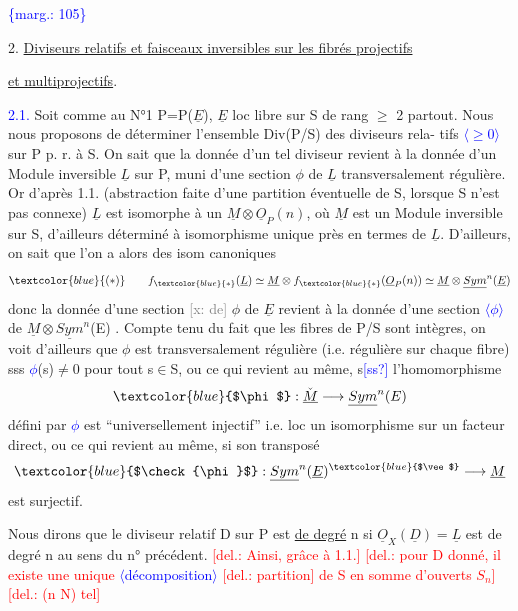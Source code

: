 \documentclass[11pt]{article}
\newcommand{\scanpage}[1]{\par\bigskip\noindent{\small\sffamily[scan #1]}\par}
\newcommand{\mspage}[1]{{\small\sffamily[p.\,#1]}}
\newcommand{\hand}[1]{\textcolor{blue}{#1}}
\newcommand{\inserted}[2][]{\textcolor{blue}{$\langle$#2$\rangle$}}
\newcommand{\margin}[1]{\textcolor{blue}{\{\textsf{marg.:} #1\}}}
\newcommand{\deleted}[1]{\textcolor{red}{[\textsf{del.:} #1]}}
\newcommand{\xout}[1]{\textcolor{gray}{[\textsf{x:} #1]}}
\newcommand{\uline}[1]{\underline{#1}}
\newcommand{\unsure}[1]{[#1?]}
\begin{document}
\margin{105}

\clearpage
\scanpage{25/106}
\mspage{9}

2. \uline{Diviseurs relatifs et faisceaux inversibles sur les fibrés projectifs}

\uline{et multiprojectifs}.

\hand{2.1.} Soit comme au N°1 P=P($\underline{E}$), $\underline{E}$ loc libre sur S de rang $\geqslant$ 2 partout.
Nous nous proposons de déterminer l'ensemble Div(P/S) des diviseurs rela-%
tifs \inserted{$\geqslant 0$} sur P p. r. à S. On sait que la donnée d'un tel diviseur revient à la
donnée d'un Module inversible $\underline{L}$ sur P, muni d'une section $\phi$ de $\underline{L}$
transversalement régulière. Or d'après 1.1. (abstraction faite d'une
partition éventuelle de S, lorsque S n'est pas connexe) $\underline{L}$ est isomorphe
à un $\underline{M}\otimes\underline{O}_P(n)$, où $\underline{M}$ est un Module inversible sur S, d'ailleurs déterminé
à isomorphisme unique près en termes de $\underline{L}$. D'ailleurs, on sait que
l'on a alors des isom canoniques
\[ \hand{(*)} \qquad f_{\hand{*}}(\underline{L}) \simeq \underline{M}\otimes f_{\hand{*}}(\underline{O}_P(n)) \simeq \underline{M}\otimes\underline{Sym}^n(\underline{E}) \]
donc la donnée d'une section \xout{de} $\phi$ de $\underline{E}$ revient à la donnée d'une section
\inserted{$\phi$} de $\underline{M}\otimes\underline{Sym}^n$(E) . Compte tenu du fait que les fibres de P/S sont intègres,
on voit d'ailleurs que $\phi$ est transversalement régulière (i.e. régulière
sur chaque fibre) sss \hand{$\phi$}(s)$\neq$0 pour tout s$\in$S, ou ce qui revient au même,
s\hand{\unsure{ss}} l'homomorphisme
\[ \hand{$\phi$} : \check{\underline{M}} \longrightarrow \underline{Sym}^n(E) \]
défini par \hand{$\phi$} est ``universellement injectif'' i.e. loc un isomorphisme sur
un facteur direct, ou ce qui revient au même, si son transposé
\[ \hand{$\check{\phi}$} : \underline{Sym}^n(\underline{E})^{\hand{$\vee$}} \longrightarrow \underline{M} \]
est surjectif.

Nous dirons que le diviseur relatif D sur P est \uline{de degré} n
si $\underline{O}_X(\underline{D})= \underline{L}$ est de degré n au sens du n° précédent. \deleted{Ainsi, grâce à 1.1.}
\deleted{pour D donné, il existe une unique \inserted{décomposition} \deleted{partition} de S en somme d'ouverts $S_n$}
\deleted{(n N) tel}
\end{document}
